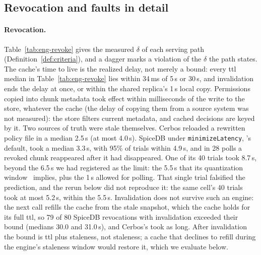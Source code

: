 \subsection{Revocation and faults in detail}\label{app:eng-revoke}

\paragraph{Revocation.}
Table~\ref{tab:eng-revoke} gives the measured $\delta$ of each serving path
(Definition~\ref{def:criteria}), and a dagger marks a violation of the $\delta$ the path states.
The cache's time to live is the realized delay, not merely a bound: every ttl median in
Table~\ref{tab:eng-revoke} lies within 34\,ms of 5\,s or 30\,s, and invalidation ends the delay at
once, or within the shared replica's 1\,s local copy. Permissions copied into chunk metadata took effect
within milliseconds of the write to the store, whatever the cache (the delay of copying them from a source system was not measured): the store filters current metadata, and cached
decisions are keyed by it. Two sources of truth were stale themselves.
Cerbos reloaded a rewritten policy file in a median 2.5\,s (at most 4.0\,s). SpiceDB under
\texttt{minimizeLatency}, \sys{}'s default, took a median 3.3\,s, with 95\% of trials within 4.9\,s, and
in 28 polls a revoked chunk reappeared after it had disappeared. One of its 40 trials took 8.7\,s,
beyond the 6.5\,s we had registered as the limit: the 5.5\,s that its quantization
window~\cite{authzed2026consistency,authzed2026reference} implies, plus the 1\,s allowed for polling.
That single trial falsified the prediction, and the rerun below did not reproduce it: the same cell's
40 trials took at most 5.2\,s, within the 5.5\,s. Invalidation does not survive such an engine: the next call
refills the cache from the stale snapshot, which the cache holds for its full ttl, so 79 of 80 SpiceDB
revocations with invalidation exceeded their bound (medians 30.0 and 31.0\,s), and Cerbos's took as
long. After invalidation the bound is ttl plus staleness, not staleness; a cache that declines to
refill during the engine's staleness window would restore it, which we evaluate below.

